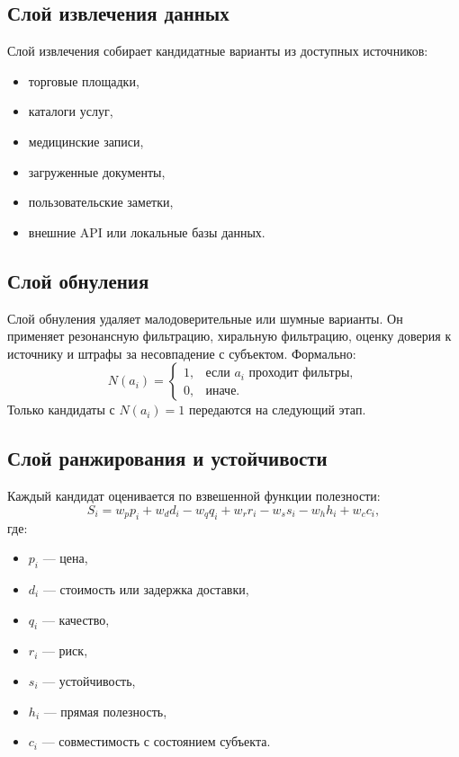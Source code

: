 \documentclass[11pt,a4paper]{article}
\begin{document}
\subsection{Слой извлечения данных}
Слой извлечения собирает кандидатные варианты из доступных источников:
\begin{itemize}[leftmargin=1.2em]
    \item торговые площадки,
    \item каталоги услуг,
    \item медицинские записи,
    \item загруженные документы,
    \item пользовательские заметки,
    \item внешние API или локальные базы данных.
\end{itemize}

\subsection{Слой обнуления}
Слой обнуления удаляет малодоверительные или шумные варианты. Он применяет резонансную фильтрацию, хиральную фильтрацию, оценку доверия к источнику и штрафы за несовпадение с субъектом. Формально:
\[
N(a_i) =
\begin{cases}
1, & \text{если } a_i \text{ проходит фильтры}, \\
0, & \text{иначе}.
\end{cases}
\]
Только кандидаты с $N(a_i)=1$ передаются на следующий этап.

\subsection{Слой ранжирования и устойчивости}
Каждый кандидат оценивается по взвешенной функции полезности:
\[
S_i = w_p p_i + w_d d_i - w_q q_i + w_r r_i - w_s s_i - w_h h_i + w_c c_i,
\]
где:
\begin{itemize}[leftmargin=1.2em]
    \item $p_i$ — цена,
    \item $d_i$ — стоимость или задержка доставки,
    \item $q_i$ — качество,
    \item $r_i$ — риск,
    \item $s_i$ — устойчивость,
    \item $h_i$ — прямая полезность,
    \item $c_i$ — совместимость с состоянием субъекта.
\end{itemize}
\end{document}
